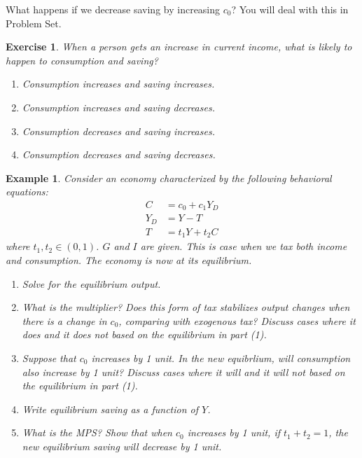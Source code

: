 \documentclass[12pt]{article}
\newtheorem{example}{Example}
\newtheorem{exercise}{Exercise}
\begin{document}
What happens if we decrease saving by increasing $c_0$? You will deal with this in Problem Set.

\begin{exercise}
    When a person gets an increase in current income, what is likely to happen to consumption and saving?
    \begin{enumerate}[label=\Alph*.]
        \item Consumption increases and saving increases.
        \item Consumption increases and saving decreases.
        \item Consumption decreases and saving increases.
        \item Consumption decreases and saving decreases.
    \end{enumerate}
\end{exercise}

\begin{example}
    Consider an economy characterized by the following behavioral equations:
    \begin{align*}
        C &= c_0 + c_1 Y_D\\
        Y_D &= Y - T\\
        T &= t_1 Y + t_2 C
    \end{align*}
    where $t_1, t_2 \in (0,1)$. $G$ and $I$ are given. This is case when we tax both income and consumption. The economy is now at its equilibrium.
    \begin{enumerate}[label=(\arabic*)]
        \item Solve for the equilibrium output.
        \item What is the multiplier? Does this form of tax stabilizes output changes when there is a change in $c_0$, comparing with exogenous tax? Discuss cases where it does and it does not based on the equilibrium in part (1).
        \item Suppose that $c_0$ increases by 1 unit. In the new equibrlium, will consumption also increase by 1 unit? Discuss cases where it will and it will not based on the equilibrium in part (1).
        \item Write equilibrium saving as a function of $Y$.
        \item What is the MPS? Show that when $c_0$ increases by 1 unit, if $t_1+t_2=1$, the new equilibrium saving will decrease by 1 unit.
    \end{enumerate} 
\end{example}
\end{document}
